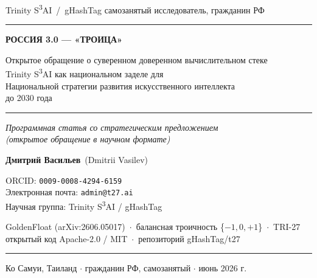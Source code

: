 \documentclass[12pt]{article}
\begin{document}
\begin{titlepage}
\centering

\vspace*{0.6cm}

{\sffamily\fontsize{13}{16}\selectfont\color{trinitygray}
Trinity S\textsuperscript{3}AI \,/\, gHashTag \quad{\textbf{\textperiodcentered}}\quad самозанятый исследователь, гражданин РФ\par}

\vspace{0.4cm}
{\color{trinityblue}\rule{\textwidth}{1.2pt}}
\vspace{1.4cm}

{\sffamily\bfseries\fontsize{26}{30}\selectfont\color{trinityblue}
РОССИЯ 3.0 --- «ТРОИЦА»\par}

\vspace{0.9cm}

{\sffamily\fontsize{15}{20}\selectfont
Открытое обращение о суверенном доверенном вычислительном стеке\\
Trinity S\textsuperscript{3}AI как национальном заделе для\\
Национальной стратегии развития искусственного интеллекта\\
до 2030 года\par}

\vspace{1.2cm}
{\color{trinitygray}\rule{0.45\textwidth}{0.5pt}}
\vspace{1.2cm}

{\itshape\fontsize{12}{16}\selectfont\color{trinitygray}
Программная статья со стратегическим предложением\\
(открытое обращение в научном формате)\par}

\vfill

{\fontsize{13}{18}\selectfont
\textbf{Дмитрий Васильев} \,(Dmitrii Vasilev)\par}
\vspace{0.3cm}
{\fontsize{11}{15}\selectfont
ORCID: \texttt{0009-0008-4294-6159}\\
Электронная почта: \texttt{admin@t27.ai}\\
Научная группа: Trinity S\textsuperscript{3}AI / gHashTag\par}

\vspace{1.0cm}

{\sffamily\fontsize{10}{14}\selectfont\color{trinitygray}
GoldenFloat (arXiv:2606.05017) \,$\cdot$\, балансная троичность \{$-1, 0, +1$\} \,$\cdot$\, TRI-27\\
открытый код Apache-2.0 / MIT \,$\cdot$\, репозиторий gHashTag/t27\par}

\vspace{1.0cm}
{\color{trinityblue}\rule{\textwidth}{1.2pt}}
\vspace{0.4cm}

{\fontsize{12}{16}\selectfont
Ко Самуи, Таиланд \quad $\cdot$ \quad гражданин РФ, самозанятый \quad $\cdot$ \quad июнь 2026 г.\par}

\vspace{0.4cm}

\end{titlepage}
\end{document}
